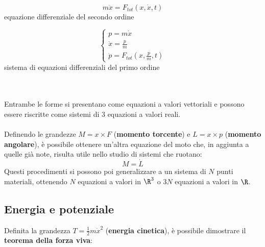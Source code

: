 \documentclass{article}
\begin{document}
\begin{minipage}[c]{.45\columnwidth}
\begin{center}
$$ m\ddot x=F_{tot}(x,\dot x, t)$$
\small equazione differenziale del secondo ordine
\end{center}
\end{minipage}
\begin{minipage}[c]{.45\columnwidth}
\begin{center}
    \begin{equation*}
    \begin{cases}
    p=m\dot x\\
    \dot x = \frac{p}{m}\\
    \dot p = F_{tot}(x, \frac{p}{m}, t)
    \end{cases}
\end{equation*}
\small sistema di equazioni differenziali del primo ordine
\end{center}
\end{minipage}
\\\\
Entrambe le forme si presentano come equazioni a valori vettoriali e possono essere riscritte come sistemi di 3 equazioni a valori reali.\\\\ 
Definendo le grandezze $M=x\times F$ (\textbf{momento torcente}) e $L=x\times p$ (\textbf{momento angolare}), è possibile ottenere un'altra equazione del moto che, in aggiunta a quelle già note, risulta utile nello studio di sistemi che ruotano:
$$ M=\dot L$$
Questi procedimenti si possono poi generalizzare a un sistema di $N$ punti materiali, ottenendo $N$ equazioni a valori in $\R^3$ o $3N$ equazioni a valori in $\R$.

\subsection{Energia e potenziale}
Definita la grandezza $T=\frac{1}{2}m\dot x^2$ (\textbf{energia cinetica}), è possibile dimostrare il \textbf{teorema della forza viva}:
\end{document}

